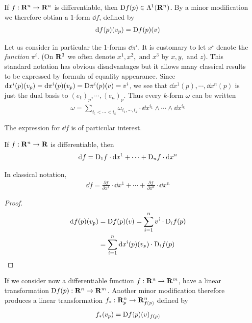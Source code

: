 If $f:\mathbf{R}^n\to \mathbf{R}^n$ is differentiable, then $\mathrm{D}f(p)\in\Lambda^1(\mathbf{R}^n)$. 
By a minor modification we therefore obtian a 1-form $\dd f$, defined by 
\begin{align*}
    \mathrm{d} f(p)(v_p) = \mathrm{D}f(p)(v)
\end{align*}

Let us consider in particular the 1-forms $\dd \pi^i$. It is customary to let $x^i$ denote the 
\textit{function} $\pi^i$. (On $\mathbf{R}^3$ we often denote $x^1,x^2,\text{ and }x^3$ by $x, y,\text{ and } z$).
This standard notation has obvious disadvantages but it allows many classical results to be expressed by 
formula of equality appearance. Since $\mathrm{d} x^i(p)(v_p) =\mathrm{d} \pi^i(p)(v_p) = \mathrm{D}\pi^i(p)(v) = v^i$, we 
see that $\dd x^1(p),\cdots,\dd x^n(p)$ is just the dual basis to $(e_1)_p,\cdots,(e_n)_p$. Thus
every $k$-form $\omega$ can be written
\begin{align*}
    \omega = \sum_{i_1<\cdots<i_k}^{}{\omega_{i_1,\cdots,i_k}\cdot \dd x^{i_1}\wedge\cdots\wedge\dd x^{i_k}}
\end{align*}

The expression for $\dd f$ is of particular interest.

\begin{theorem}
    If $f:\mathbf{R}^n\to \mathbf{R}$ is differentiable, then 
    \begin{align*}
        \mathrm{d} f = \mathrm{D}_1 f\cdot \mathrm{d} x^1 + \cdots + \mathrm{D}_nf\cdot \mathrm{d} x^n
    \end{align*} 

    In classical notation,
    \begin{align*}
        \dd f = \frac{\partial f}{\partial x^1}\cdot \dd x^1 + \cdots + \frac{\partial f}{\partial x^n}\cdot \dd x^n
    \end{align*}
\end{theorem}

\begin{proof}
    \begin{align*}
        \mathrm{d} f(p)(v_p) 
            & = \mathrm{D}f(p)(v) 
            = \sum_{i=1}^{n}{v^i\cdot \mathrm{D}_i f(p)} \\
            & = \sum_{i=1}^{n}{\mathrm{d} x^i(p)(v_p)\cdot \mathrm{D}_i f(p)}
    \end{align*}
\end{proof}


If we consider now a differentiable function $f:\mathbf{R}^n\to \mathbf{R}^m$, 
have a linear transformation $\mathrm{D}f(p):\mathbf{R}^n\to \mathbf{R}^m$. Another 
minor modification therefore produces a linear transformation $f_*:\mathbf{R}^n_p\to \mathbf{R}^n_{f(p)}$
defined by 
\begin{align*}
    f_*(v_p) = \mathrm{D}f(p)(v)_{f(p)}
\end{align*}

